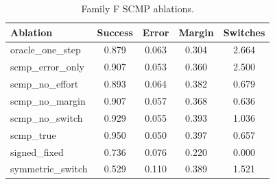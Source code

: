 \begin{table}[t]
\centering
\small
\caption{Family F SCMP ablations.}
\label{tab:ablations}
\begin{tabular}{lcccc}
\toprule
Ablation & Success & Error & Margin & Switches \\
\midrule
oracle\_one\_step & 0.879 & 0.063 & 0.304 & 2.664 \\
scmp\_error\_only & 0.907 & 0.053 & 0.360 & 2.500 \\
scmp\_no\_effort & 0.893 & 0.064 & 0.382 & 0.679 \\
scmp\_no\_margin & 0.907 & 0.057 & 0.368 & 0.636 \\
scmp\_no\_switch & 0.929 & 0.055 & 0.393 & 1.036 \\
scmp\_true & 0.950 & 0.050 & 0.397 & 0.657 \\
signed\_fixed & 0.736 & 0.076 & 0.220 & 0.000 \\
symmetric\_switch & 0.529 & 0.110 & 0.389 & 1.521 \\
\bottomrule
\end{tabular}
\end{table}
